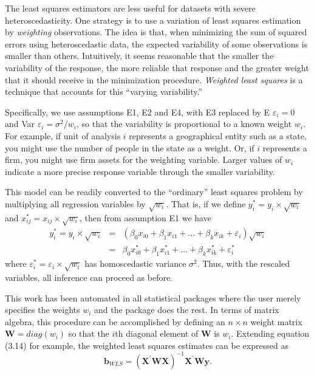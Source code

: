 The least squares estimators are less useful for datasets with
severe heteroscedasticity. One strategy is to use a variation of
least squares estimation by \emph{weighting} observations. The idea
is that, when minimizing the sum of squared errors using
heteroscedastic data, the expected variability of some observations
is smaller than others. Intuitively, it seems reasonable that the
smaller the variability of the response, the more reliable that
response and the greater weight that it should receive in the
minimization procedure. \textit{Weighted least squares} is a
technique that accounts for this ``varying variability.''

Specifically, we use assumptions E1, E2 and E4, with E3 replaced by
E $\varepsilon_i = 0$ and Var $\varepsilon_i = \sigma^2 / w_i$, so
that the variability is proportional to a known weight $w_i$. For
example, if unit of analysis $i$ represents a geographical entity
such as a state, you might use the number of people in the state as
a weight. Or, if $i$ represents a firm, you might use firm assets
for the weighting variable. Larger values of $w_i$ indicate a more
precise response variable through the smaller variability.

This model can be readily converted to the ``ordinary'' least
squares problem by multiplying all regression variables by
$\sqrt{w_i}.$ That is, if we define $y_i^{\ast} = y_i \times
\sqrt{w_i}$ and $x_{ij}^{\ast} = x_{ij} \times \sqrt{w_i}$, then
from assumption E1 we have
\begin{eqnarray*}
y_i^{\ast} = y_i \times \sqrt{w_i} &=& \left( \beta_0 x_{i0}+\beta_1
x_{i1}+\ldots+\beta_k x_{ik}+\varepsilon_i \right) \sqrt{w_i}\\
&=&\beta_0 x_{i0}^{\ast} +\beta_1 x_{i1}^{\ast}+\ldots+\beta_k
x_{ik}^{\ast} + \varepsilon_i^{\ast}
\end{eqnarray*}
where $\varepsilon_i^{\ast}=\varepsilon_i \times \sqrt{w_i}$ has
homoscedastic variance $\sigma^2$. Thus, with the rescaled
variables, all inference can proceed as before.

This work has been automated in all statistical packages where the
user merely specifies the weights $w_i$ and the package does the
rest. In terms of matrix algebra, this procedure can be accomplished
by defining an $n \times n$ weight matrix $\mathbf{W} = diag(w_i)$
so that the $i$th diagonal element of $\mathbf{W}$ is $w_i$.
Extending equation (3.14) for example, the weighted least squares
estimates can be expressed as
\begin{equation}\label{E5:WLSCoefficients}
\mathbf{b}_{WLS} = \left(\mathbf{X}^{\prime} \mathbf{W}\mathbf{X}
\right)^{-1}\mathbf{X}^{\prime} \mathbf{W}\mathbf{y} .
\end{equation}


